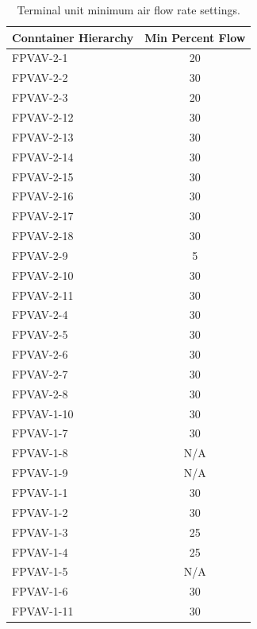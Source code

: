 \begin{table}[]
\centering
\caption{Terminal unit minimum air flow rate settings.}
\label{tab:MinimumAirFlowRateSettings}
\begin{tabular}{lS}
    \toprule
Conntainer Hierarchy & {Min Percent Flow} \\ \midrule
FPVAV-2-1            & 20                              \\
FPVAV-2-2            & 30                              \\
FPVAV-2-3            & 20                              \\
FPVAV-2-12           & 30                              \\
FPVAV-2-13           & 30                              \\
FPVAV-2-14           & 30                              \\
FPVAV-2-15           & 30                              \\
FPVAV-2-16           & 30                              \\
FPVAV-2-17           & 30                              \\
FPVAV-2-18           & 30                              \\
FPVAV-2-9            & 5                               \\
FPVAV-2-10           & 30                              \\
FPVAV-2-11           & 30                              \\
FPVAV-2-4            & 30                              \\
FPVAV-2-5            & 30                              \\
FPVAV-2-6            & 30                              \\
FPVAV-2-7            & 30                              \\
FPVAV-2-8            & 30                              \\
FPVAV-1-10           & 30                              \\
FPVAV-1-7            & 30                              \\
FPVAV-1-8            & {N/A}                           \\
FPVAV-1-9            & {N/A}                           \\
FPVAV-1-1            & 30                              \\
FPVAV-1-2            & 30                              \\
FPVAV-1-3            & 25                              \\
FPVAV-1-4            & 25                              \\
FPVAV-1-5            & {N/A}                           \\
FPVAV-1-6            & 30                              \\
FPVAV-1-11           & 30               \\ \bottomrule
\end{tabular}
\end{table}




